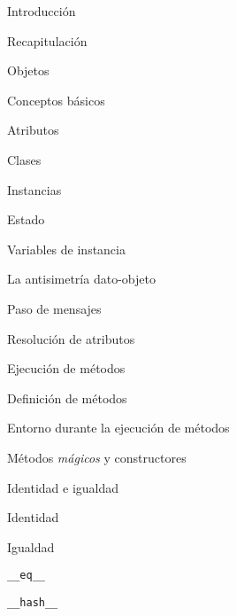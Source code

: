 \begin{longenum}
\begin{longenum}
        \item Introducción
        \begin{longenum}
            \item Recapitulación
            \item Objetos
        \end{longenum}
        \item Conceptos básicos
        \begin{longenum}
            \item Atributos
            \item Clases
            \begin{longenum}
                \item Instancias
            \end{longenum}
            \item Estado
            \begin{longenum}
                \item Variables de instancia
            \end{longenum}
            \item La antisimetría dato-objeto
        \end{longenum}
        \item Paso de mensajes
        \begin{longenum}
            \item Resolución de atributos
            \item Ejecución de métodos
            \item Definición de métodos
            \begin{longenum}
                \item Entorno durante la ejecución de métodos
            \end{longenum}
            \item Métodos \textit{mágicos} y constructores
        \end{longenum}
        \item Identidad e igualdad
        \begin{longenum}
            \item Identidad
            \item Igualdad
            \begin{longenum}
                \item \texttt{\_\_eq\_\_}
                \item \texttt{\_\_hash\_\_}
            \end{longenum}

\end{longenum}
\end{longenum}
\end{longenum}
